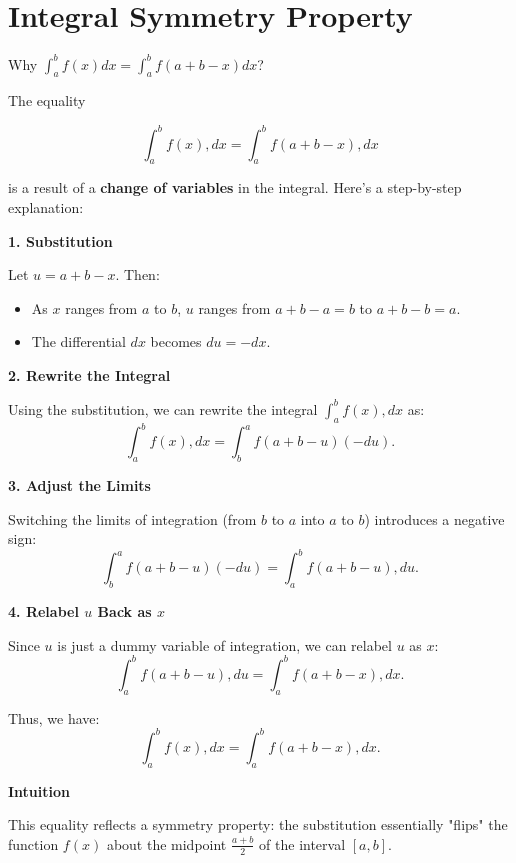 \documentclass[a4paper,12pt]{book}
\begin{document}
\section{Integral Symmetry Property}

\begin{bluebox}
Why \( \int_a^b f(x) dx = \int_a^b f(a+b-x) dx \)?
\end{bluebox}

The equality

\[
\int_a^b f(x) , dx = \int_a^b f(a+b-x) , dx
\]

is a result of a \textbf{change of variables} in the integral. Here's a step-by-step explanation:

\hrulefill

\textbf{1. Substitution}

Let \( u = a + b - x \). Then:
\begin{itemize}
\item 
As \( x \) ranges from \( a \) to \( b \), \( u \) ranges from \( a + b - a = b \) to \( a + b - b = a \).

\item 
The differential \( dx \) becomes \( du = -dx \).

\end{itemize}

\hrulefill

\textbf{2. Rewrite the Integral}

Using the substitution, we can rewrite the integral \( \int_a^b f(x) , dx \) as:
\[
\int_a^b f(x) , dx = \int_b^a f(a + b - u) (-du).
\]

\hrulefill

\textbf{3. Adjust the Limits}

Switching the limits of integration (from \( b \) to \( a \) into \( a \) to \( b \)) introduces a negative sign:
\[
\int_b^a f(a + b - u) (-du) = \int_a^b f(a + b - u) , du.
\]

\hrulefill

\textbf{4. Relabel \( u \) Back as \( x \)}

Since \( u \) is just a dummy variable of integration, we can relabel \( u \) as \( x \):
\[
\int_a^b f(a + b - u) , du = \int_a^b f(a + b - x) , dx.
\]

Thus, we have:
\[
\int_a^b f(x) , dx = \int_a^b f(a + b - x) , dx.
\]

\hrulefill

\textbf{Intuition}

This equality reflects a symmetry property: the substitution essentially "flips" the function \( f(x) \) about the midpoint \( \frac{a+b}{2} \) of the interval \([a, b]\).
\end{document}
